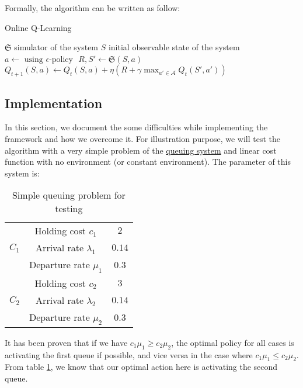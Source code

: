 \documentclass[
  a4paper, xcolor = usenames,dvipsnames]{article}
\begin{document}
Formally, the algorithm can be written as follow:

\begin{algorithm}
\caption{Online Q-Learning}\label{alg:on-q-learning}
$\mathfrak{S}$ simulator of the system\;
$S$ initial observable state of the system\;
 {
  $a \gets \text{ using } \epsilon\text{-policy }$\;
  $R, S' \gets \mathfrak{S}(S, a)$\;
  $Q_{t+1}(S, a) \gets Q_{t}(S, a) + \eta (R + \gamma \max_{a' \in \mathcal{A}} Q_{t}(S', a'))$ \;
}
\end{algorithm}

\hypertarget{implementation}{%
\subsection{Implementation}\label{implementation}}

In this section, we document the some difficulties while implementing the framework and how we overcome it. For illustration purpose, we will test the algorithm with a very simple problem of the \protect\hyperlink{queuing-system}{queuing system}
and linear cost function with no environment (or constant environment). The parameter of this system is:

\begin{table}[ht]
\caption{Simple queuing problem for testing}
\begin{center}
\begin{tabular}{c c c}
    \hline
    \multirow{3}{*}{$C_{1}$} & Holding cost $c_{1}$ & $2$ \\
    & Arrival rate $\lambda_{1}$ & $0.14$ \\
    & Departure rate $\mu_{1}$ & $0.3$ \\
    \cline{2-3}
    \multirow{3}{*}{$C_{2}$} & Holding cost $c_{2}$ & $3$ \\
    & Arrival rate $\lambda_{2}$ & $0.14$ \\
    & Departure rate $\mu_{2}$ & $0.3$ \\    
    \hline
\end{tabular}
\end{center}
\label{tab:q-learning-test}
\end{table}

It has been proven that if we have \(c_{1} \mu_{1} \ge c_{2} \mu_{2}\), the optimal policy for all cases is activating the first queue if possible, and vice versa in the case where \(c_{1} \mu_{1} \le c_{2} \mu_{2}\). From table \ref{tab:q-learning-test}, we know that our optimal action here is activating the second queue.
\end{document}
